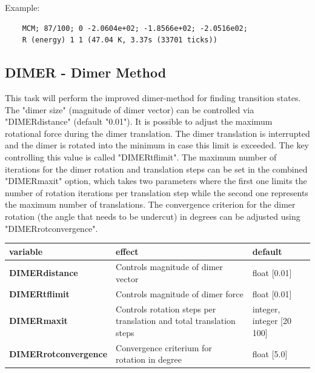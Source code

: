 \documentclass[10pt,a4paper]{article} %
\begin{document}
	Example:\\
	\begin{lstlisting}
	MCM; 87/100; 0 -2.0604e+02; -1.8566e+02; -2.0516e02;
	R (energy) 1 1 (47.04 K, 3.37s (33701 ticks))
	\end{lstlisting}

	\subsection{DIMER - Dimer Method}
	This task will perform the improved dimer-method for finding transition states\supercite{dimermethod}. The "dimer size" (magnitude of dimer vector) can be controlled via "DIMERdistance" (default "0.01").
	It is possible to adjust the maximum rotational force during the dimer translation. The dimer translation is interrupted and the dimer is rotated into the minimum in case this limit is exceeded. The key controlling this value is called "DIMERtflimit".
	The maximum number of iterations for the dimer rotation and translation steps can be set in the combined "DIMERmaxit" option, which takes two parameters where the first one limits the number of rotation iterations per translation step while the second one represents the maximum number of translations.
	The convergence criterion for the dimer rotation (the angle that needs to be undercut) in degrees can be adjusted using "DIMERrotconvergence".
		
	\begin{tabularx}{\textwidth}{l|X|X}
		variable & effect & default \\
		\hline
		\textbf{DIMERdistance} & Controls magnitude of dimer vector & float [0.01] \\
		\textbf{DIMERtflimit} & Controls magnitude of dimer force & float [0.01] \\
		\textbf{DIMERmaxit}& Controls rotation steps per translation and total translation steps & integer, integer [20 100]\\
		\textbf{DIMERrotconvergence} & Convergence criterium for rotation in degree & float [5.0] \\
	\end{tabularx}
	
\end{document}
